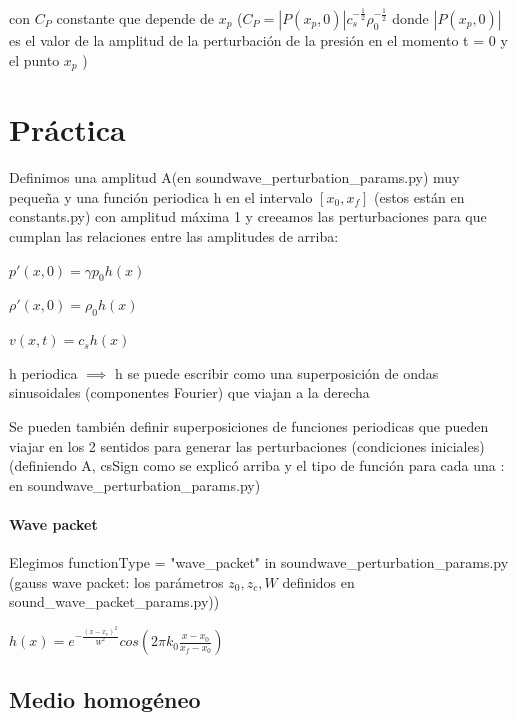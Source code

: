 \documentclass{article}
\begin{document}
\begin{description}
\item con $C_P$ constante que depende de $x_p$ ($C_P = |P(x_p,0)|  c_s^{-\frac{1}{2}} \rho_0^{-\frac{1}{2}}$ donde $|P(x_p,0)|$
es el valor de la amplitud de la perturbación de la presión en el momento t = 0 y el punto $x_p$ )

\end{description}

\section{Práctica}
\begin{description}
\item Definimos una amplitud A(en soundwave\_perturbation\_params.py) muy pequeña y una función periodica h en el intervalo $[x_0, x_f]$ (estos están en constants.py) con amplitud máxima 1 y creeamos las perturbaciones para que cumplan las relaciones entre las amplitudes de arriba:
\item  $p\prime(x,0) = \gamma p_0 h(x) $ 
\item  $\rho\prime(x,0) = \rho_0 h(x) $
\item  $v(x, t) =  c_s h(x) $
\item h periodica $\implies$ h se puede escribir como una superposición de ondas sinusoidales (componentes Fourier) que viajan a la derecha
\item Se pueden también definir superposiciones de funciones periodicas que pueden viajar en los 2 sentidos para generar las perturbaciones (condiciones iniciales) 
(definiendo A, csSign como se explicó arriba y el tipo de función para cada una  : en soundwave\_perturbation\_params.py)
\end{description}

\paragraph{Wave packet} Elegimos functionType = "wave\_packet" in soundwave\_perturbation\_params.py  (gauss wave packet: los parámetros $z_0,z_c,W$ definidos en sound\_wave\_packet\_params.py))
\begin{center}
 $h(x) = e^{- \frac{(x-x_c)^2}{W^2}} cos(2 \pi  k_0 \frac{x - x_0}{x_f - x_0}) $
\end{center}

\subsection{Medio homogéneo}
\end{document}
